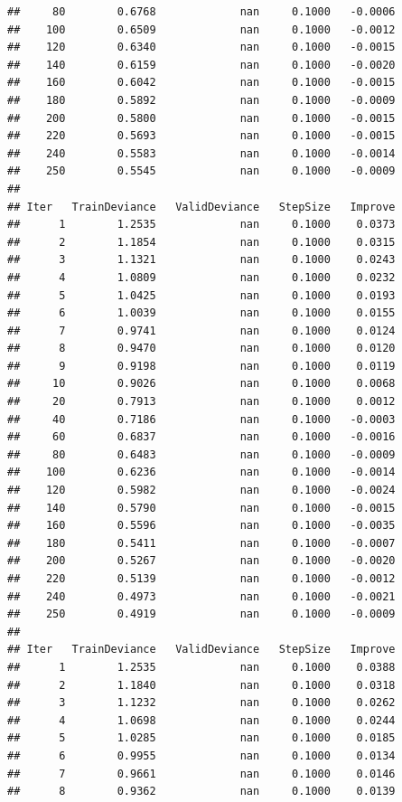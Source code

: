\documentclass[
]{book}
\begin{document}
\begin{verbatim}
##     80        0.6768             nan     0.1000   -0.0006
##    100        0.6509             nan     0.1000   -0.0012
##    120        0.6340             nan     0.1000   -0.0015
##    140        0.6159             nan     0.1000   -0.0020
##    160        0.6042             nan     0.1000   -0.0015
##    180        0.5892             nan     0.1000   -0.0009
##    200        0.5800             nan     0.1000   -0.0015
##    220        0.5693             nan     0.1000   -0.0015
##    240        0.5583             nan     0.1000   -0.0014
##    250        0.5545             nan     0.1000   -0.0009
## 
## Iter   TrainDeviance   ValidDeviance   StepSize   Improve
##      1        1.2535             nan     0.1000    0.0373
##      2        1.1854             nan     0.1000    0.0315
##      3        1.1321             nan     0.1000    0.0243
##      4        1.0809             nan     0.1000    0.0232
##      5        1.0425             nan     0.1000    0.0193
##      6        1.0039             nan     0.1000    0.0155
##      7        0.9741             nan     0.1000    0.0124
##      8        0.9470             nan     0.1000    0.0120
##      9        0.9198             nan     0.1000    0.0119
##     10        0.9026             nan     0.1000    0.0068
##     20        0.7913             nan     0.1000    0.0012
##     40        0.7186             nan     0.1000   -0.0003
##     60        0.6837             nan     0.1000   -0.0016
##     80        0.6483             nan     0.1000   -0.0009
##    100        0.6236             nan     0.1000   -0.0014
##    120        0.5982             nan     0.1000   -0.0024
##    140        0.5790             nan     0.1000   -0.0015
##    160        0.5596             nan     0.1000   -0.0035
##    180        0.5411             nan     0.1000   -0.0007
##    200        0.5267             nan     0.1000   -0.0020
##    220        0.5139             nan     0.1000   -0.0012
##    240        0.4973             nan     0.1000   -0.0021
##    250        0.4919             nan     0.1000   -0.0009
## 
## Iter   TrainDeviance   ValidDeviance   StepSize   Improve
##      1        1.2535             nan     0.1000    0.0388
##      2        1.1840             nan     0.1000    0.0318
##      3        1.1232             nan     0.1000    0.0262
##      4        1.0698             nan     0.1000    0.0244
##      5        1.0285             nan     0.1000    0.0185
##      6        0.9955             nan     0.1000    0.0134
##      7        0.9661             nan     0.1000    0.0146
##      8        0.9362             nan     0.1000    0.0139

\end{verbatim}
\end{document}
